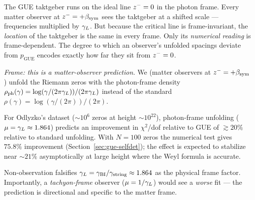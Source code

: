 \begin{remark}
The GUE taktgeber runs on the ideal line $z^-=0$ in the photon frame.
Every matter observer at $z^-=+\beta_{\mathrm{sym}}$ sees the taktgeber at a shifted
scale --- frequencies multiplied by $\gamma_L$.
But because the critical line is frame-invariant, the \emph{location} of
the taktgeber is the same in every frame.
Only its \emph{numerical reading} is frame-dependent.
The degree to which an observer's unfolded spacings deviate from
$p_{\mathrm{GUE}}$ encodes exactly how far they sit from $z^-=0$.
\end{remark}

\begin{corollary}
\label{cor:odlyzko}
\emph{Frame: this is a matter-observer prediction.}
We (matter observers at $z^-=+\beta_{\mathrm{sym}}$) unfold the Riemann zeros
with the photon-frame density $\rho_{\mathrm{ph}}(\gamma) =
\log(\gamma/(2\pi\gamma_L))/(2\pi\gamma_L)$ instead of the standard
$\rho(\gamma) = \log(\gamma/(2\pi))/(2\pi)$.

For Odlyzko's dataset (${\sim}10^6$ zeros at height ${\sim}10^{22}$),
photon-frame unfolding ($\mu=\gamma_L\approx 1.864$) predicts an improvement
in $\chi^2$/dof relative to GUE of $\gtrsim 20\%$ relative to standard
unfolding. With $N=100$ zeros the numerical test gives $75.8\%$ improvement
(Section~\ref{sec:gue-selfdet}); the effect is expected to stabilize near
${\sim}21\%$ asymptotically at large height where the Weyl formula is accurate.

Non-observation falsifies $\gamma_L=\gamma_{\mathrm{BI}}/\gamma_{\mathrm{string}}\approx 1.864$ as the physical
frame factor. Importantly, a \emph{tachyon-frame} observer ($\mu=1/\gamma_L$)
would see a \emph{worse} fit --- the prediction is directional and specific
to the matter frame.
\end{corollary}


